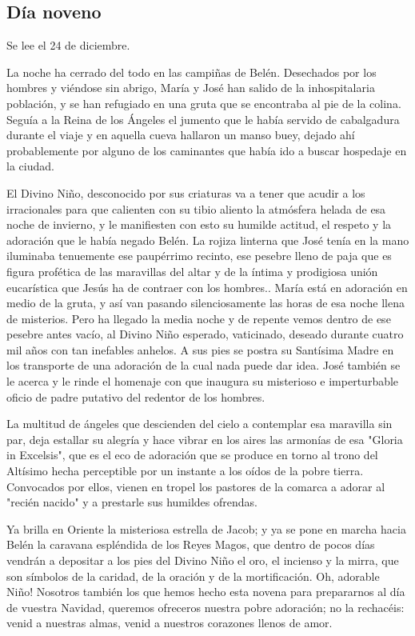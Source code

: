 \documentclass[spanish,utf8,twocolumn]{chlart}
\newenvironment{summary}{\begingroup
	\small\sffamily\itshape%
	\setlength{\leftskip}{3em}\setlength{\rightskip}{3em}\noindent
	}{\par\endgroup}
\newenvironment{lectura}{\begingroup\color{lector}}{\endgroup\par}
\begin{document}
\subsection*{Día noveno}
\begin{summary}
Se lee el 24 de diciembre.
\end{summary}
\begin{lectura}
La noche ha cerrado del todo en las campiñas de Belén.
Desechados por los hombres y viéndose sin abrigo, María y José han
salido de la inhospitalaria población, y se han refugiado en una gruta
que se encontraba al pie de la colina.
Seguía a la Reina de los Ángeles el jumento que le había servido de
cabalgadura durante el viaje y en aquella cueva hallaron un manso buey,
dejado ahí probablemente por alguno de los caminantes que había ido a
buscar hospedaje en la ciudad.

El Divino Niño, desconocido por sus criaturas va a tener que acudir a
los irracionales para que calienten con su tibio aliento la atmósfera
helada de esa noche de invierno, y le manifiesten con esto su humilde
actitud, el respeto y la adoración que le había negado Belén.
La rojiza linterna que José tenía en la mano iluminaba tenuemente ese
paupérrimo recinto, ese pesebre lleno de paja que es figura profética de
las maravillas del altar y de la íntima y prodigiosa unión eucarística
que Jesús ha de contraer con los hombres..
María está en adoración en medio de la gruta, y así van pasando
silenciosamente las horas de esa noche llena de misterios.
Pero ha llegado la media noche y de repente vemos dentro de ese pesebre
antes vacío, al Divino Niño esperado, vaticinado, deseado durante cuatro
mil años con tan inefables anhelos.
A sus pies se postra su Santísima Madre en los transporte de una
adoración de la cual nada puede dar idea.
José también se le acerca y le rinde el homenaje con que inaugura su
misterioso e imperturbable oficio de padre putativo del redentor de los
hombres.

La multitud de ángeles que descienden del cielo a contemplar esa
maravilla sin par, deja estallar su alegría y hace vibrar en los aires
las armonías de esa "Gloria in Excelsis", que es el eco de adoración que
se produce en torno al trono del Altísimo hecha perceptible por un
instante a los oídos de la pobre tierra.
Convocados por ellos, vienen en tropel los pastores de la comarca a
adorar al "recién nacido" y a prestarle sus humildes ofrendas.

Ya brilla en Oriente la misteriosa estrella de Jacob; y ya se pone en
marcha hacia Belén la caravana espléndida de los Reyes Magos, que dentro
de pocos días vendrán a depositar a los pies del Divino Niño el oro, el
incienso y la mirra, que son símbolos de la caridad, de la oración y de
la mortificación.
Oh, adorable Niño!
Nosotros también los que hemos hecho esta novena para prepararnos al día
de vuestra Navidad, queremos ofreceros nuestra pobre adoración; no la
rechacéis:
venid a nuestras almas, venid a nuestros corazones llenos de amor.


\end{lectura}
\end{document}
